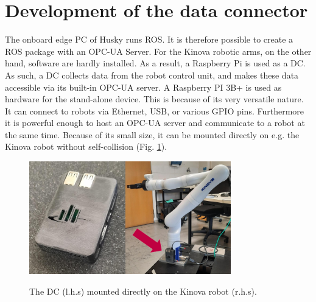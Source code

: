 \documentclass[conference]{IEEEtran}
\begin{document}
\section{Development of the data connector}
The onboard edge PC of Husky  runs ROS. It is therefore possible to create a ROS package with an OPC-UA Server.
For the Kinova robotic arms, on the other hand,  software are hardly installed. As a result, a Raspberry Pi is used as a DC. As such, a DC collects  data from the robot control unit, and makes these data accessible via its built-in OPC-UA server. A Raspberry PI 3B+ is used as hardware for the stand-alone device. This is because of its very versatile nature. It can connect to robots via Ethernet, USB, or various GPIO pins. Furthermore it is powerful enough to host an OPC-UA server and communicate to a robot at the same time.
Because of its small size, it can be mounted directly on e.g. the Kinova robot without self-collision (Fig. \ref{fig:dataConectorPic}).\\

\begin{figure}[t]
    \centerline{\includegraphics[height=4.9cm]{Pictures/PiGehaeuseVorne.jpeg}\hspace{0.1cm}\includegraphics[height=4.9cm]{Pictures/PiAmKinova.jpeg}}
    \caption{The DC (l.h.s) mounted directly on the Kinova robot (r.h.s).}
    \label{fig:dataConectorPic}
\end{figure}
\end{document}
